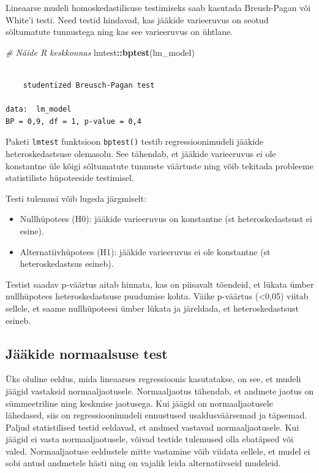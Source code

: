 \documentclass[
]{book}
\newenvironment{Shaded}{\begin{snugshade}}{\end{snugshade}}
\newcommand{\CommentTok}[1]{\textcolor[rgb]{0.56,0.35,0.01}{\textit{#1}}}
\newcommand{\FunctionTok}[1]{\textcolor[rgb]{0.13,0.29,0.53}{\textbf{#1}}}
\newcommand{\NormalTok}[1]{#1}
\newcommand{\SpecialCharTok}[1]{\textcolor[rgb]{0.81,0.36,0.00}{\textbf{#1}}}
\providecommand{\tightlist}{%
  \setlength{\itemsep}{0pt}\setlength{\parskip}{0pt}}
\renewenvironment{Shaded} {\begin{snugshade}\footnotesize} {\end{snugshade}}
\begin{document}
Lineaarse mudeli homoskedastilisuse testimiseks saab kasutada Breush-Pagan või White'i testi. Need testid hindavad, kas jääkide varieeruvus on seotud sõltumatute tunnustega ning kas see varieeruvus on ühtlane.

\begin{Shaded}
\begin{Highlighting}[]
\CommentTok{\# Näide R keskkonnas}
\NormalTok{lmtest}\SpecialCharTok{::}\FunctionTok{bptest}\NormalTok{(lm\_model)}
\end{Highlighting}
\end{Shaded}

\begin{verbatim}

    studentized Breusch-Pagan test

data:  lm_model
BP = 0,9, df = 1, p-value = 0,4
\end{verbatim}

Paketi \texttt{lmtest} funktsioon \texttt{bptest()} testib regressioonimudeli jääkide heteroskedastsuse olemasolu. See tähendab, et jääkide varieeruvus ei ole konstantne üle kõigi sõltumatute tunnuste väärtuste ning võib tekitada probleeme statistiliste hüpoteeside testimisel.

Testi tulemusi võib lugeda järgmiselt:

\begin{itemize}
\tightlist
\item
  Nullhüpotees (H0): jääkide varieeruvus on konstantne (st heteroskedastsust ei esine).
\item
  Alternatiivhüpotees (H1): jääkide varieeruvus ei ole konstantne (st heteroskedastsus esineb).
\end{itemize}

Testist saadav p-väärtus aitab hinnata, kas on piisavalt tõendeid, et lükata ümber nullhüpotees heteroskedastsuse puudumise kohta. Väike p-väärtus (\textless0,05) viitab sellele, et saame nullhüpoteesi ümber lükata ja järeldada, et heteroskedastsust esineb.

\subsection{Jääkide normaalsuse test}\label{juxe4uxe4kide-normaalsuse-test}

Üks oluline eeldus, mida lineaarses regressioonis kasutatakse, on see, et mudeli jäägid vastaksid normaaljaotusele. Normaaljaotus tähendab, et andmete jaotus on sümmeetriline ning keskmise jaotusega. Kui jäägid on normaaljaotusele lähedased, siis on regressioonimudeli ennustused usaldusväärsemad ja täpsemad. Paljud statistilised testid eeldavad, et andmed vastavad normaaljaotusele. Kui jäägid ei vasta normaaljaotusele, võivad testide tulemused olla ebatäpsed või valed. Normaaljaotuse eeldustele mitte vastamine võib viidata sellele, et mudel ei sobi antud andmetele hästi ning on vajalik leida alternatiivseid mudeleid.
\end{document}
